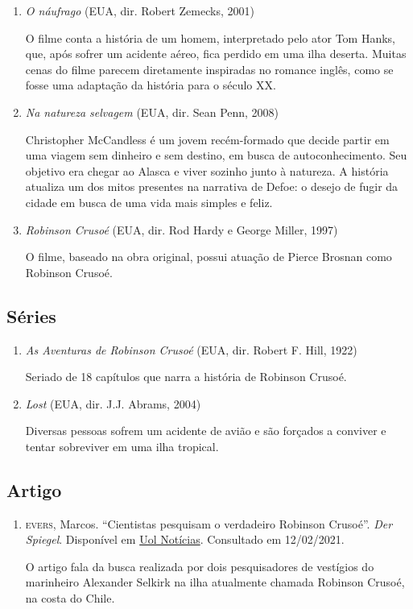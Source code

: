 \documentclass[12pt]{extarticle}
\begin{document}
\begin{enumerate}

\item
\emph{O náufrago} (EUA, dir. Robert Zemecks, 2001)


O filme conta a história de um homem, interpretado pelo ator Tom Hanks,
que, após sofrer um acidente aéreo, fica perdido em uma ilha deserta.
Muitas cenas do filme parecem diretamente inspiradas no romance inglês,
como se fosse uma adaptação da história para o século XX.

\item
\emph{Na natureza selvagem} (EUA, dir. Sean Penn, 2008)


Christopher McCandless é um jovem recém-formado que decide partir em uma
viagem sem dinheiro e sem destino, em busca de autoconhecimento. Seu
objetivo era chegar ao Alasca e viver sozinho junto à natureza. A
história atualiza um dos mitos presentes na narrativa de Defoe: o desejo
de fugir da cidade em busca de uma vida mais simples e feliz.

\item
\emph{Robinson Crusoé} (EUA, dir. Rod Hardy e George Miller, 1997)

O filme, baseado na obra original, possui atuação de Pierce Brosnan como Robinson Crusoé.


\end{enumerate}

\subsection{Séries}

\begin{enumerate}
\item
\emph{As Aventuras de Robinson Crusoé} (EUA, dir. Robert F. Hill, 1922)

Seriado de 18 capítulos que narra a história de Robinson Crusoé.

\item
\emph{Lost} (EUA, dir. J.J. Abrams, 2004)

Diversas pessoas sofrem um acidente de avião e são forçados a conviver e tentar sobreviver em uma ilha tropical.
\end{enumerate}

\subsection{Artigo}

\begin{enumerate}
\item
\textsc{evers}, Marcos. ``Cientistas pesquisam o verdadeiro Robinson Crusoé''.
\emph{Der Spiegel}. Disponível em \href{https://noticias.uol.com.br/midiaglobal/derspiegel/2009/02/07/ult2682u1076.jhtm}{Uol Notícias}. Consultado em
12/02/2021.


O artigo fala da busca realizada por dois pesquisadores de vestígios do
marinheiro Alexander Selkirk na ilha atualmente chamada Robinson Crusoé,
na costa do Chile.

\end{enumerate}
\end{document}
